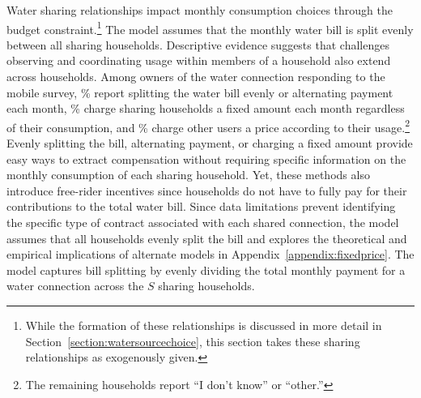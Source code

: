 \documentclass[12pt]{article}
\begin{document}
Water sharing relationships impact monthly consumption choices through the budget constraint.\footnote{While the formation of these relationships is discussed in more detail in Section~\ref{section:watersourcechoice}, this section takes these sharing relationships as exogenously given.}  The model assumes that the monthly water bill is split evenly between all sharing households.  Descriptive evidence suggests that challenges observing and coordinating usage within members of a household also extend across households.  Among owners of the water connection responding to the mobile survey, \unskip\% report splitting the water bill evenly or alternating payment each month, \unskip\% charge sharing households a fixed amount each month regardless of their consumption, and \unskip\% charge other users a price according to their usage.\footnote{The remaining households report ``I don't know'' or ``other.''}  Evenly splitting the bill, alternating payment, or charging a fixed amount provide easy ways to extract compensation without requiring specific information on the monthly consumption of each sharing household.  Yet, these methods also introduce free-rider incentives since households do not have to fully pay for their contributions to the total water bill.  Since data limitations prevent identifying the specific type of contract associated with each shared connection, the model assumes that all households evenly split the bill and explores the theoretical and empirical implications of alternate models in Appendix~\ref{appendix:fixedprice}.  The model captures bill splitting by evenly dividing the total monthly payment for a water connection across the $S$ sharing households.  

\end{document}
